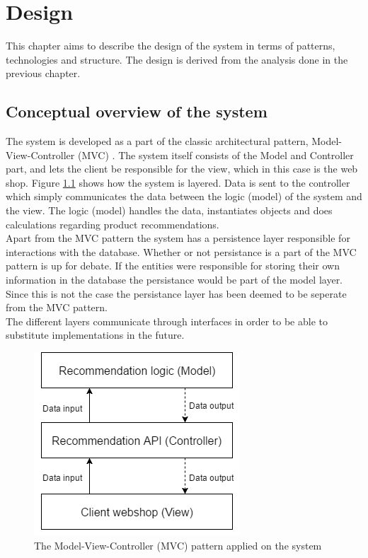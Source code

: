 
\chapter{Design} %

\label{Chapter3} %

This chapter aims to describe the design of the system in terms of patterns, technologies and structure. The design is derived from the analysis done in the previous chapter.

\section{Conceptual overview of the system}
The system is developed as a part of the classic architectural pattern, Model-View-Controller (MVC) \cite{PatternsOfEnterprise}. The system itself consists of the Model and Controller part, and lets the client be responsible for the view, which in this case is the web shop. Figure \ref{fig:MVC} shows how the system is layered. Data is sent to the controller which simply communicates the data between the logic (model) of the system and the view. The logic (model) handles the data, instantiates objects and does calculations regarding product recommendations. \\
Apart from the MVC pattern the system has a persistence layer responsible for interactions with the database. Whether or not persistance is a part of the MVC pattern is up for debate. If the entities were responsible for storing their own information in the database the persistance would be part of the model layer. Since this is not the case the persistance layer has been deemed to be seperate from the MVC pattern. \\
The different layers communicate through interfaces in order to be able to substitute implementations in the future. 

\begin{figure}[H]
	\centering
	\includegraphics[width=.4\linewidth]{Figures/MVC.png}
	\caption{The Model-View-Controller (MVC) pattern applied on the system}
	\label{fig:MVC}
\end{figure}

